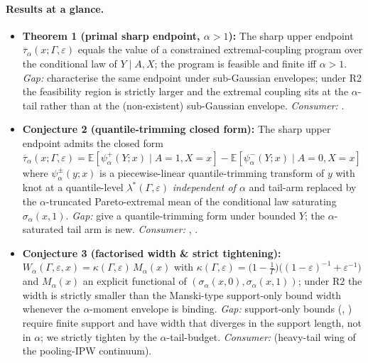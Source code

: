 \documentclass[11pt]{article}
\newcommand{\E}{\mathbb{E}}
\theoremstyle{definition}
\theoremstyle{plain}
\theoremstyle{remark}
\begin{document}
\paragraph{Results at a glance.}
\begin{itemize}[leftmargin=2em]
  \item \textbf{Theorem 1 (primal sharp endpoint, $\alpha > 1$):} The sharp upper endpoint $\overline{\tau}_\alpha(x;\Gamma,\varepsilon)$ equals the value of a constrained extremal-coupling program over the conditional law of $Y \mid A,X$; the program is feasible and finite iff $\alpha > 1$. \emph{Gap:} \citet{YadlowskyNamkoongBasuDuchiTian2022} characterise the same endpoint under sub-Gaussian envelopes; under R2 the feasibility region is strictly larger and the extremal coupling sits at the $\alpha$-tail rather than at the (non-existent) sub-Gaussian envelope. \emph{Consumer:} \citet{AsiaeePalBeckHuling2026SharpGeneralization}.
  \item \textbf{Conjecture 2 (quantile-trimming closed form):} The sharp upper endpoint admits the closed form $\overline{\tau}_\alpha(x;\Gamma,\varepsilon) = \E[\psi^+_\alpha(Y;x) \mid A = 1, X = x] - \E[\psi^-_\alpha(Y;x) \mid A = 0, X = x]$ where $\psi^\pm_\alpha(y;x)$ is a piecewise-linear quantile-trimming transform of $y$ with knot at a quantile-level $\lambda^*(\Gamma,\varepsilon)$ \emph{independent of $\alpha$} and tail-arm replaced by the $\alpha$-truncated Pareto-extremal mean of the conditional law saturating $\sigma_\alpha(x,1)$. \emph{Gap:} \citet{KallusMaoZhou2019CATEIntervals} give a quantile-trimming form under bounded $Y$; the $\alpha$-saturated tail arm is new. \emph{Consumer:} \citet{KallusMaoZhou2019CATEIntervals}, \citet{DornGuoKallus2025}.
  \item \textbf{Conjecture 3 (factorised width \& strict tightening):} $W_\alpha(\Gamma,\varepsilon,x) = \kappa(\Gamma,\varepsilon)\,M_\alpha(x)$ with $\kappa(\Gamma,\varepsilon) = \big(1 - \tfrac{1}{\Gamma}\big)\bigl((1-\varepsilon)^{-1} + \varepsilon^{-1}\bigr)$ and $M_\alpha(x)$ an explicit functional of $(\sigma_\alpha(x,0),\sigma_\alpha(x,1))$; under R2 the width is strictly smaller than the Manski-type support-only bound width whenever the $\alpha$-moment envelope is binding. \emph{Gap:} support-only bounds (\citealt{Manski1990}, \citealt{AronowLee2013}) require finite support and have width that diverges in the support length, not in $\alpha$; we strictly tighten by the $\alpha$-tail-budget. \emph{Consumer:} \citet{LeeWeidner2021PoolingBounds} (heavy-tail wing of the pooling-IPW continuum).

\end{itemize}
\end{document}
